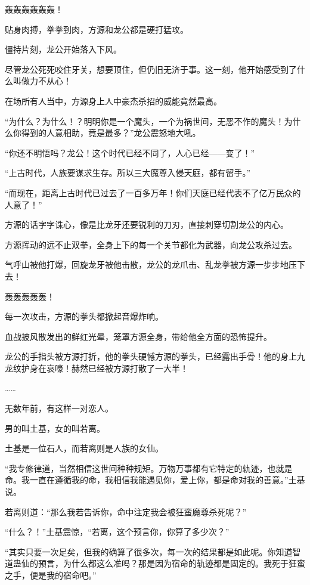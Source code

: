 \begin{this_body}
轰轰轰轰轰轰！

贴身肉搏，拳拳到肉，方源和龙公都是硬打猛攻。

僵持片刻，龙公开始落入下风。

尽管龙公死死咬住牙关，想要顶住，但仍旧无济于事。这一刻，他开始感受到了什么叫做力不从心！

在场所有人当中，方源身上人中豪杰杀招的威能竟然最高。

“为什么？为什么！？明明你是一个魔头，一个为祸世间，无恶不作的魔头！为什么你得到的人意相助，竟是最多？”龙公震怒地大吼。

“你还不明悟吗？龙公！这个时代已经不同了，人心已经——变了！”

“上古时代，人族要谋求生存。所以三大魔尊入侵天庭，都有留手。”

“而现在，距离上古时代已过去了一百多万年！你们天庭已经代表不了亿万民众的人意了！”

方源的话字字诛心，像是比龙牙还要锐利的刀刃，直接刺穿切割龙公的内心。

方源挥动的远不止双拳，全身上下的每一个关节都化为武器，向龙公攻杀过去。

气呼山被他打爆，回旋龙牙被他击散，龙公的龙爪击、乱龙拳被方源一步步地压下去！

轰轰轰轰轰！

每一次攻击，方源的拳头都掀起音爆炸响。

血战披风散发出的鲜红光晕，笼罩方源全身，带给他全方面的恐怖提升。

龙公的手指头被方源打折，他的拳头硬憾方源的拳头，已经露出手骨！他的身上九龙纹护身在哀嚎！赫然已经被方源打散了一大半！

……

无数年前，有这样一对恋人。

男的叫土基，女的叫若离。

土基是一位石人，而若离则是人族的女仙。

“我专修律道，当然相信这世间种种规矩。万物万事都有它特定的轨迹，也就是命。我一直在遵循我的命，我相信我能遇见你，爱上你，都是命对我的善意。”土基说。

若离则道：“那么我若告诉你，命中注定我会被狂蛮魔尊杀死呢？”

“什么？！”土基震惊，“若离，这个预言你，你算了多少次？”

“其实只要一次足矣，但我的确算了很多次，每一次的结果都是如此呢。你知道智道蛊仙的预言，为什么都这么准吗？那是因为宿命的轨迹都是固定的。我死于狂蛮之手，便是我的宿命吧。”


\end{this_body}
